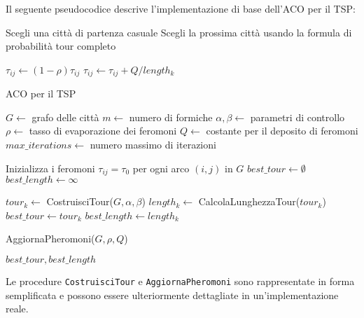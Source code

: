 Il seguente pseudocodice descrive l'implementazione di base dell'\gls{ACO} per il \gls{TSP}:

\begin{algorithm}
	\begin{algorithmic}[1]
		\State Scegli una città di partenza casuale
		\State Scegli la prossima città usando la formula di probabilità
		\EndWhile
		\State \Return tour completo
		\EndProcedure

		\State $\tau_{ij} \gets (1-\rho)\tau_{ij}$
		\State $\tau_{ij} \gets \tau_{ij} + Q/length_k$
		\EndIf
		\EndFor
		\EndFor
		\EndProcedure
	\end{algorithmic}
\end{algorithm}

\begin{algorithm}
	\caption{\gls{ACO} per il \gls{TSP}}\label{alg:aco-tsp}
	\begin{algorithmic}[1]
		\State $G \gets$ grafo delle città
		\State $m \gets$ numero di formiche
		\State $\alpha, \beta \gets$ parametri di controllo
		\State $\rho \gets$ tasso di evaporazione dei feromoni
		\State $Q \gets$ costante per il deposito di feromoni
		\State $max\_iterations \gets$ numero massimo di iterazioni

		\State Inizializza i feromoni $\tau_{ij} = \tau_0$ per ogni arco $(i,j)$ in $G$
		\State $best\_tour \gets \emptyset$
		\State $best\_length \gets \infty$

		\State $tour_k \gets$ CostruisciTour($G, \alpha, \beta$)
		\State $length_k \gets$ CalcolaLunghezzaTour($tour_k$)
		\State $best\_tour \gets tour_k$
		\State $best\_length \gets length_k$
		\EndIf
		\EndFor

		\State AggiornaPheromoni($G, \rho, Q$)
		\EndFor

		\State \Return $best\_tour, best\_length$
		\EndProcedure

	\end{algorithmic}
\end{algorithm}

Le procedure \texttt{CostruisciTour} e \texttt{AggiornaPheromoni} sono rappresentate in forma semplificata e possono essere ulteriormente dettagliate in un'implementazione reale.

